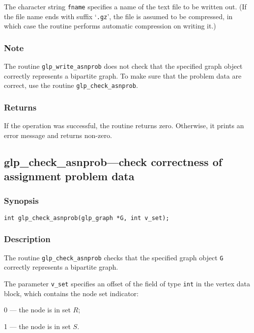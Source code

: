 The character string \verb|fname| specifies a name of the text file to
be written out. (If the file name ends with suffix `\verb|.gz|', the
file is assumed to be compressed, in which case the routine performs
automatic compression on writing it.)

\subsubsection*{Note}

The routine \verb|glp_write_asnprob| does not check that the specified
graph object correctly represents a bipartite graph. To make sure that
the problem data are correct, use the routine \verb|glp_check_asnprob|.

\subsubsection*{Returns}

If the operation was successful, the routine returns zero. Otherwise,
it prints an error message and returns non-zero.

\newpage

\subsection{glp\_check\_asnprob---check correctness of assignment
problem data}

\subsubsection*{Synopsis}

\begin{verbatim}
int glp_check_asnprob(glp_graph *G, int v_set);
\end{verbatim}

\subsubsection*{Description}

The routine \verb|glp_check_asnprob| checks that the specified graph
object \verb|G| correctly represents a bipartite graph.

The parameter \verb|v_set| specifies an offset of the field of type
\verb|int| in the vertex data block, which contains the node set
indicator:

0 --- the node is in set $R$;

1 --- the node is in set $S$.


